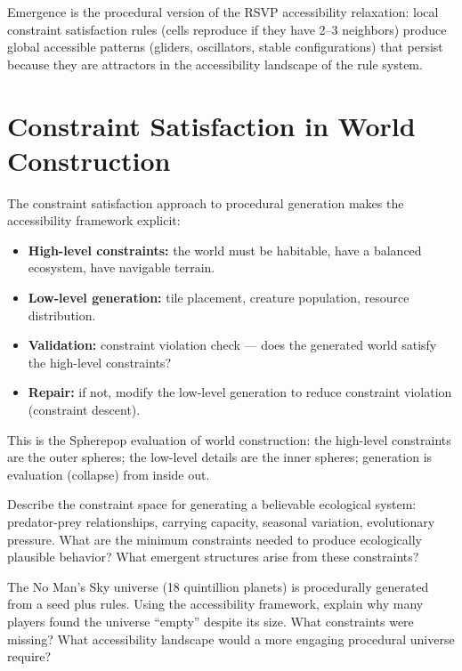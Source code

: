 Emergence is the procedural version of the RSVP accessibility
relaxation: local constraint satisfaction rules (cells reproduce
if they have 2--3 neighbors) produce global accessible patterns
(gliders, oscillators, stable configurations) that persist because
they are attractors in the accessibility landscape of the rule system.

\section{Constraint Satisfaction in World Construction}

The constraint satisfaction approach to procedural generation makes
the accessibility framework explicit:

\begin{itemize}
  \item \textbf{High-level constraints:} the world must be habitable,
        have a balanced ecosystem, have navigable terrain.
  \item \textbf{Low-level generation:} tile placement, creature
        population, resource distribution.
  \item \textbf{Validation:} constraint violation check — does the
        generated world satisfy the high-level constraints?
  \item \textbf{Repair:} if not, modify the low-level generation
        to reduce constraint violation (constraint descent).
\end{itemize}

This is the Spherepop evaluation of world construction: the high-level
constraints are the outer spheres; the low-level details are the inner
spheres; generation is evaluation (collapse) from inside out.

\begin{exercise}
  Describe the constraint space for generating a believable ecological
  system: predator-prey relationships, carrying capacity, seasonal
  variation, evolutionary pressure. What are the minimum constraints
  needed to produce ecologically plausible behavior? What emergent
  structures arise from these constraints?
\end{exercise}

\begin{exercise}
  The No Man's Sky universe (18 quintillion planets) is procedurally
  generated from a seed plus rules. Using the accessibility framework,
  explain why many players found the universe ``empty'' despite its size.
  What constraints were missing? What accessibility landscape would
  a more engaging procedural universe require?
\end{exercise}
